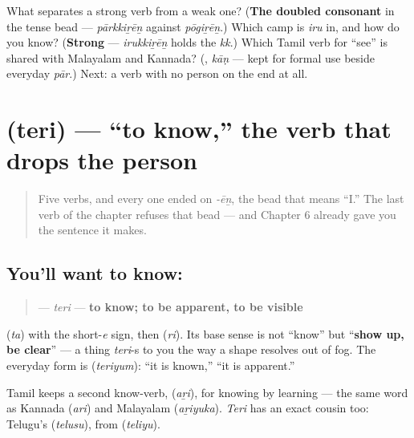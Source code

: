 \begin{tcolorbox}[breakable,colback=teal!4,colframe=teal!35!black,title={Before you move on}]
What separates a strong verb from a weak one? (\textbf{The doubled consonant} in the tense bead — \emph{pārkkiṟēṉ} against \emph{pōgiṟēṉ}.) Which camp is \emph{iru} in, and how do you know? (\textbf{Strong} — \emph{irukkiṟēṉ} holds the \emph{kk}.) Which Tamil verb for \textquotedblleft{}see\textquotedblright{} is shared with Malayalam and Kannada? (\textbf{}, \emph{kāṇ} — kept for formal use beside everyday \emph{pār}.) Next: a verb with no person on the end at all.
\end{tcolorbox}
\section[\texorpdfstring{\ta{தெரி} (teri)}{தெரி (teri)}]{ (teri) — \textquotedblleft{}to know,\textquotedblright{} the verb that drops the person}

\label{lesson:TA-C32-teri}



\begin{quote}
Five verbs, and every one ended on \emph{-ēṉ}, the bead that means \textquotedblleft{}I.\textquotedblright{} The last verb of the chapter refuses that bead — and Chapter 6 already gave you the sentence it makes.
\end{quote}

\subsection*{You'll want to know: }
\begin{quote}
\textbf{} — \emph{teri} — \textbf{to know; to be apparent, to be visible}
\end{quote}

\textbf{} (\emph{ta}) with the short-\emph{e} sign, then \textbf{} (\emph{ri}). Its base sense is not \textquotedblleft{}know\textquotedblright{} but \textquotedblleft{}\textbf{show up, be clear}\textquotedblright{} — a thing \emph{teri}-s to you the way a shape resolves out of fog. The everyday form is \textbf{} (\emph{teriyum}): \textquotedblleft{}it is known,\textquotedblright{} \textquotedblleft{}it is apparent.\textquotedblright{}

Tamil keeps a second know-verb, \textbf{} (\emph{aṟi}), for knowing by learning — the same word as Kannada \textbf{} (\emph{ari}) and Malayalam \textbf{} (\emph{aṟiyuka}). \emph{Teri} has an exact cousin too: Telugu's \textbf{} (\emph{telusu}), from \textbf{} (\emph{teliyu}).

